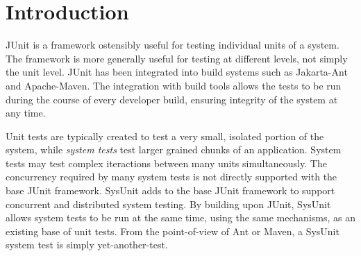 \chapter{Introduction}

JUnit is a framework ostensibly useful for testing
individual units of a system.  The framework is more generally useful
for testing at different levels, not simply the unit level.  JUnit
has been integrated into build systems 
such as Jakarta-Ant and Apache-Maven.  
The integration with build tools
allows the tests to be run during the course of every developer
build, ensuring integrity of the system at any time.

Unit tests are
typically created to test a very small, isolated portion of the
system, while 
\emph{system tests}
test larger grained chunks of an application.  System tests may test
complex iteractions between many units simultaneously.  The
concurrency required by many system tests is not directly supported
with the base JUnit framework.  SysUnit adds to
the base JUnit framework to support concurrent and distributed
system testing.  By building upon JUnit, SysUnit allows system tests
to be run at the same time, using the same mechanisms, as an
existing base of unit tests.  From the point-of-view of Ant or
Maven, a SysUnit system test is simply yet-another-test.
